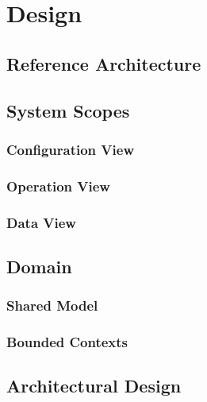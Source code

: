 \chapter{Design}
\label{chap:design}

\section{Reference Architecture}
\label{sec:design:ref_architecture}

\section{System Scopes}
\label{sec:design:system_scopes}

\subsection{Configuration View}
\label{subsec:design:system_scopes:configuration_view}

\subsection{Operation View}
\label{subsec:design:system_scopes:operation_view}

\subsection{Data View}
\label{subsec:design:system_scopes:data_view}

\section{Domain}
\label{sec:design:domain}

\subsection{Shared Model}
\label{subsec:design:domain:shared_model}

\subsection{Bounded Contexts}
\label{subsec:design:domain:bounded_contexts}

\section{Architectural Design}
\label{sec:design:architecture}

